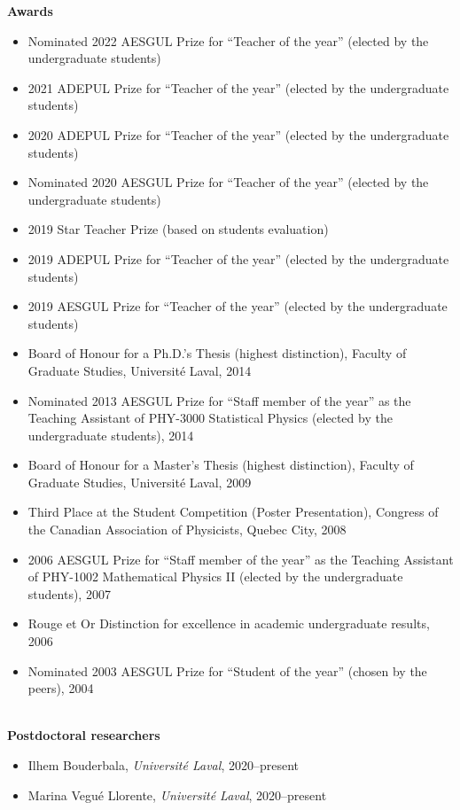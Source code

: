 \documentclass[11pt]{article}
\newcommand{\TitreSection}[1]{\colorbox{background}{\makebox[\textwidth-0.5em][c]{\Large\textrm{\textsc{#1}}}}\vspace{0.75\baselineskip}\\}
\begin{document}
%
%
%
\textbf{Awards}
%
\begin{itemize}
  \item Nominated 2022 AESGUL Prize for ``Teacher of the year'' (elected by the undergraduate students)
  \item 2021 ADEPUL Prize for ``Teacher of the year'' (elected by the undergraduate students)
  \item 2020 ADEPUL Prize for ``Teacher of the year'' (elected by the undergraduate students)
  \item Nominated 2020 AESGUL Prize for ``Teacher of the year'' (elected by the undergraduate students)
  \item 2019 Star Teacher Prize (based on students evaluation)
  \item 2019 ADEPUL Prize for ``Teacher of the year'' (elected by the undergraduate students)
  \item 2019 AESGUL Prize for ``Teacher of the year'' (elected by the undergraduate students)
  \item Board of Honour for a Ph.D.'s Thesis (highest distinction), Faculty of Graduate Studies, Universit\'e Laval, 2014
  \item Nominated 2013 AESGUL Prize for ``Staff member of the year'' as the Teaching Assistant of PHY-3000 Statistical Physics (elected by the undergraduate students), 2014
  \item Board of Honour for a Master's Thesis (highest distinction), Faculty of Graduate Studies, Universit\'e Laval, 2009
  \item Third Place at the Student Competition (Poster Presentation), Congress of the Canadian Association of Physicists, Quebec City, 2008
  \item 2006 AESGUL Prize for ``Staff member of the year'' as the Teaching Assistant of PHY-1002 Mathematical Physics II (elected by the undergraduate students), 2007
  \item Rouge et Or Distinction for excellence in academic undergraduate results, 2006
  \item Nominated 2003 AESGUL Prize for ``Student of the year'' (chosen by the peers), 2004
\end{itemize} \vspace{0.75\baselineskip}
%
%
%
%
%
\TitreSection{Mentoring}
%
\textbf{Postdoctoral researchers}
%
\begin{itemize}
  \item Ilhem Bouderbala, \textit{Universit\'e Laval}, 2020--present
  \item Marina Vegué Llorente, \textit{Université Laval}, 2020--present
\end{itemize}
\end{document}
